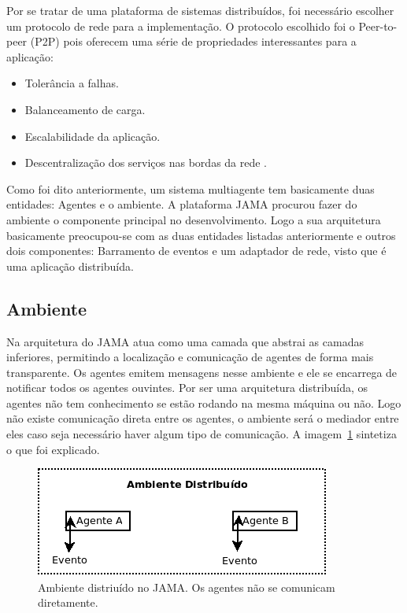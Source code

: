 Por se tratar de uma plataforma de sistemas distribuídos, foi necessário escolher um protocolo de rede para a implementação. O protocolo escolhido foi o Peer-to-peer (P2P) pois oferecem uma série de propriedades interessantes para a aplicação:
\begin{itemize}
	\item Tolerância a falhas.
	\item Balanceamento de carga.
	\item Escalabilidade da aplicação.
	\item Descentralização dos serviços nas bordas da rede	.
\end{itemize}

Como foi dito anteriormente, um sistema multiagente tem basicamente duas entidades: Agentes e o ambiente. A plataforma JAMA procurou fazer do ambiente o componente principal no desenvolvimento. Logo a sua arquitetura basicamente preocupou-se com as duas entidades listadas anteriormente e outros dois componentes: Barramento de eventos e um adaptador de rede, visto que é uma aplicação distribuída.

\subsection{Ambiente}

Na arquitetura do JAMA atua como uma camada que abstrai as camadas inferiores, permitindo a localização e comunicação de agentes de forma mais transparente. Os agentes emitem mensagens nesse ambiente e ele se encarrega de notificar todos os agentes ouvintes. Por ser uma arquitetura distribuída, os agentes não tem conhecimento se estão rodando na mesma máquina ou não. Logo não existe comunicação direta entre os agentes, o ambiente será o mediador entre eles caso seja necessário haver algum tipo de comunicação. A imagem~\ref{fig:ambiente} sintetiza o que foi explicado.

\begin{figure}
	\includegraphics[scale=0.75]{images/ambiente.png}
	\caption{Ambiente distriuído no JAMA. Os agentes não se comunicam diretamente.}
	\label{fig:ambiente}
\end{figure}

